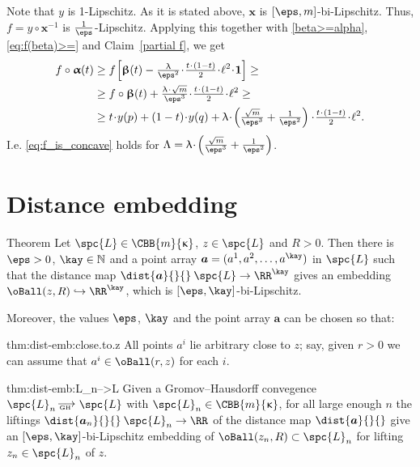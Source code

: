 Note that $y$ is 1-Lipschitz.
As it is stated above, 
$\bm{x}$ is $[\eps,m]$-bi-Lipschitz.
Thus, $f=y\circ\bm{x}^{-1}$ is $\tfrac1\eps$-Lipschitz.
Applying this 
together with \ref{beta>=alpha}, 
\ref{eq:f(beta)>=}
and Claim~\ref{partial f},
we get 
\begin{align*}
f\circ\bm{\alpha}(t)
&\ge 
f
\l[
\bm{\beta}(t)
-
\tfrac\lambda{\eps^2}\cdot\tfrac{t\cdot(1-t)}2\cdot\ell^2\cdot\bm{1}
\r]
\ge
\\
&
\ge
f\circ\bm{\beta}(t)
+
\tfrac{\lambda
\cdot 
\sqrt{m}}{\eps^3}
\cdot
\tfrac{t\cdot(1-t)}2
\cdot
\ell^2
\ge
\\
&
\ge
t\cdot y(p)
+(1-t)\cdot y(q)+
\lambda\cdot\l(\tfrac{\sqrt{m}}{\eps^3}+\tfrac1{\eps^2}\r)
\cdot 
\tfrac{t\cdot(1-t)}2
\cdot
\ell^2.
\end{align*}
I.e. \ref{eq:f_is_concave} holds for $\Lambda=\lambda\cdot\l(\tfrac{\sqrt{m}}{\eps^3}+\tfrac1{\eps^2}\r)$.
\qeds

\section{Distance embedding}\label{sec:dist-embedding}


\begin{thm}{Theorem}\label{thm:dist-emb}
Let $\spc{L}\in\CBB{m}{\kappa}$, $z\in\spc{L}$ and $R>0$.
Then there is $\eps>0$, 
$\kay\in\NN$ 
and a point array $\bm{a}=(a^1,a^2,\dots,a^\kay)$ in $\spc{L}$
such that the distance map $\dist{\bm{a}}{}{}\:\spc{L}\to\RR^\kay$ gives an embedding $\oBall(z,R)\hookrightarrow\RR^\kay$, 
which is $[\eps,\kay]$-bi-Lipschitz.

Moreover, the values $\eps$, $\kay$ and the point array $\bm{a}$ can be chosen so that:

\begin{subthm}{thm:dist-emb:close.to.z}
All points $a^i$ lie arbitrary close to $z$;
say, given $r>0$ we can assume that $a^i\in\oBall(r,z)$ for each $i$.
\end{subthm}

\begin{subthm}{thm:dist-emb:L_n-->L}
Given a Gromov--Hausdorff convegence
$\spc{L}_n\GHto\spc{L}$ with $\spc{L}_n\in\CBB{m}{\kappa}$,
for all large enough $n$
the liftings $\dist{\bm{a}_n}{}{}\:\spc{L}_n\to\RR$ of the distance map $\dist{\bm{a}}{}{}$ 
give an $[\eps,\kay]$-bi-Lipschitz embedding of $\oBall(z_n,R)\subset \spc{L}_n$ for lifting $z_n\in\spc{L}_n$ of $z$.
\end{subthm}
\end{thm}

